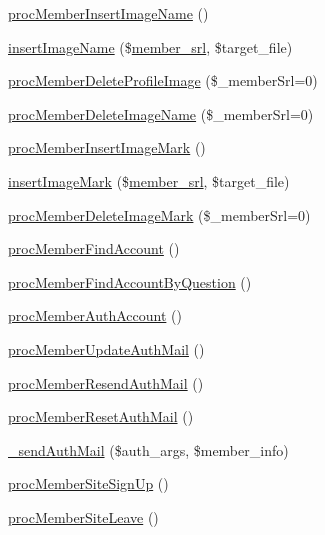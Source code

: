 \begin{DoxyCompactItemize}
\item 
\hyperlink{classmemberController_a5477f3466e28c09d13f182406893a3d6}{proc\+Member\+Insert\+Image\+Name} ()
\item 
\hyperlink{classmemberController_a723651429eec4409cc58daefb508e7bf}{insert\+Image\+Name} (\$\hyperlink{ko_8install_8php_aa61f9e08f0fe505094d26f8143f30bbd}{member\+\_\+srl}, \$target\+\_\+file)
\item 
\hyperlink{classmemberController_a469c2f84ff27c0fb9fc9ae7f3b921548}{proc\+Member\+Delete\+Profile\+Image} (\$\+\_\+member\+Srl=0)
\item 
\hyperlink{classmemberController_a5b2d6f21719829dcf1b422e9958bcf48}{proc\+Member\+Delete\+Image\+Name} (\$\+\_\+member\+Srl=0)
\item 
\hyperlink{classmemberController_afcb874e178e1c13158e364b891998640}{proc\+Member\+Insert\+Image\+Mark} ()
\item 
\hyperlink{classmemberController_a99efb504d3ab31a6365434696cb7b2fb}{insert\+Image\+Mark} (\$\hyperlink{ko_8install_8php_aa61f9e08f0fe505094d26f8143f30bbd}{member\+\_\+srl}, \$target\+\_\+file)
\item 
\hyperlink{classmemberController_a22dff50295755ba06fb55d60104dbb32}{proc\+Member\+Delete\+Image\+Mark} (\$\+\_\+member\+Srl=0)
\item 
\hyperlink{classmemberController_a6ba64b98fa5d0fd55435e464f02d050e}{proc\+Member\+Find\+Account} ()
\item 
\hyperlink{classmemberController_a1141d3b40fc5927dcbaff3b4b4b11bff}{proc\+Member\+Find\+Account\+By\+Question} ()
\item 
\hyperlink{classmemberController_a2dfdfbe05e0248b65c9aadf969195c12}{proc\+Member\+Auth\+Account} ()
\item 
\hyperlink{classmemberController_a9c41ccfb32ecb9c77a1c4f849dc7d38b}{proc\+Member\+Update\+Auth\+Mail} ()
\item 
\hyperlink{classmemberController_aa0e4416a4e98fc31701ba68581b7c14b}{proc\+Member\+Resend\+Auth\+Mail} ()
\item 
\hyperlink{classmemberController_ab0515bd2aae55dbda2049d39612ef6b2}{proc\+Member\+Reset\+Auth\+Mail} ()
\item 
\hyperlink{classmemberController_a8768cc1066bf70222fdd0f0fa2d55d31}{\+\_\+send\+Auth\+Mail} (\$auth\+\_\+args, \$member\+\_\+info)
\item 
\hyperlink{classmemberController_a4dfc326f5bc6d97b86b919c568457000}{proc\+Member\+Site\+Sign\+Up} ()
\item 
\hyperlink{classmemberController_a46240bb8dbfcff52844ce8387076ca61}{proc\+Member\+Site\+Leave} ()

\end{DoxyCompactItemize}
